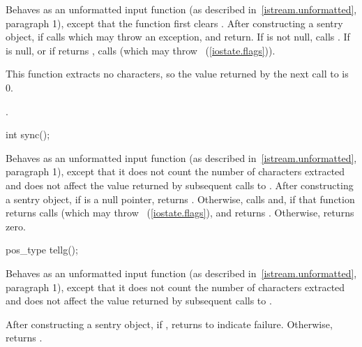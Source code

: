 \begin{itemdescr}
\pnum
\effects
Behaves as an unformatted input function (as described in~\ref{istream.unformatted}, paragraph
1), except that the function first clears .
After constructing
a sentry object, if
calls
which may throw an exception,
and return.
If
is not null, calls
.
If
is null, or if
returns
,
calls
(which may throw
~(\ref{iostate.flags})).
\begin{note}
This
function extracts no characters, so the value returned by the next call to
is 0.
\end{note}

\pnum
\returns
{}.
\end{itemdescr}

%
\begin{itemdecl}
int sync();
\end{itemdecl}

\begin{itemdescr}
\pnum
\effects
Behaves as an unformatted input function (as described in~\ref{istream.unformatted}, paragraph 1), except that it does not
count the number of characters extracted and does not affect the
value returned by subsequent calls to
.
After constructing
a sentry object, if
is a null pointer, returns .
Otherwise, calls
and, if that function returns 
calls
(which may throw
~(\ref{iostate.flags}),
and returns
.
Otherwise, returns zero.
\end{itemdescr}

%
%
\begin{itemdecl}
pos_type tellg();
\end{itemdecl}

\begin{itemdescr}
\pnum
\effects
Behaves as an unformatted input function (as described in~\ref{istream.unformatted}, paragraph 1), except that it does not count
the number of characters extracted and does not affect the value
returned by subsequent calls to
.

\pnum
\returns
After constructing a sentry object, if
,
returns
to indicate failure.
Otherwise, returns
.
\end{itemdescr}

